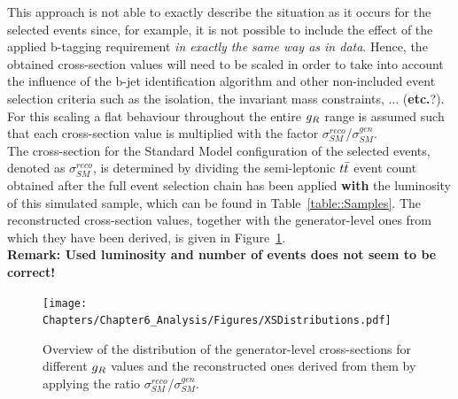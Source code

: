 This approach is not able to exactly describe the situation as it occurs for the selected events since, for example, it is not possible to include the effect of the applied b-tagging requirement \textit{in exactly the same way as in data}. Hence, the obtained cross-section values will need to be scaled in order to take into account the influence of the b-jet identification algorithm and other non-included event selection criteria such as the isolation, the invariant mass constraints, $\dots$ (\textbf{etc.}?).
For this scaling a flat behaviour throughout the entire $g_{R}$ range is assumed such that each cross-section value is multiplied with the factor $\sigma_{SM}^{reco}$/$\sigma_{SM}^{gen}$. 
\\
The cross-section for the Standard Model configuration of the selected events, denoted as $\sigma_{SM}^{reco}$, is determined by dividing the semi-leptonic $t\bar{t}$ event count obtained after the full event selection chain has been applied \textbf{with} the luminosity of this simulated sample, which can be found in Table~\ref{table::Samples}. The reconstructed cross-section values, together with the generator-level ones from which they have been derived, is given in Figure~\ref{fig::XSDistr}.
\\
\textbf{Remark: Used luminosity and number of events does not seem to be correct!}
\begin{figure}[h!t]
 \centering
 \texttt{[image: Chapters/Chapter6\_Analysis/Figures/XSDistributions.pdf]}
 \caption{Overview of the distribution of the generator-level cross-sections for different $g_{R}$ values and the reconstructed ones derived from them by applying the ratio $\sigma_{SM}^{reco}$/$\sigma_{SM}^{gen}$.} \label{fig::XSDistr}
\end{figure}

